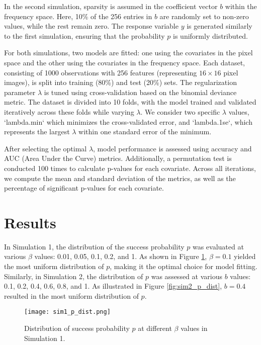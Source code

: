 \documentclass[12pt]{article}
\begin{document}
In the second simulation, sparsity is assumed in the coefficient vector \( b \) within the frequency space. Here, 10\%
of the 256 entries in \( b \) are randomly set to non-zero values, while the rest remain zero. The response variable \(
y \) is generated similarly to the first simulation, ensuring that the probability \( p \) is uniformly distributed. 

For both simulations, two models are fitted: one using the covariates in the pixel space and the other using the
covariates in the frequency space. Each dataset, consisting of 1000 observations with 256 features (representing \( 16
\times 16 \) pixel images), is split into training (80\%) and test (20\%) sets. The regularization parameter \( \lambda
\) is tuned using cross-validation based on the binomial deviance metric. The dataset is divided into 10 folds, with the
model trained and validated iteratively across these folds while varying \( \lambda \). We consider two specific \(
\lambda \) values, `lambda.min` which minimizes the cross-validated error, and `lambda.1se`, which represents the
largest \( \lambda \) within one standard error of the minimum.

After selecting the optimal \( \lambda \), model performance is assessed using accuracy and AUC (Area Under the Curve)
metrics. Additionally, a permutation test is conducted 100 times to calculate p-values for each covariate. Across all
iterations, we compute the mean and standard deviation of the metrics, as well as the percentage of significant p-values
for each covariate.  


\section*{Results}

In Simulation 1, the distribution of the success probability \( p \) was evaluated at various \( \beta \) values: 0.01,
0.05, 0.1, 0.2, and 1. As shown in Figure \ref{fig:sim1_p_dist}, \( \beta = 0.1 \) yielded the most uniform distribution
of \( p \), making it the optimal choice for model fitting. Similarly, in Simulation 2, the distribution of \( p \) was assessed at various \( b \) values: 0.1, 0.2, 0.4, 0.6, 0.8,
and 1. As illustrated in Figure \ref{fig:sim2_p_dist}, \( b = 0.4 \) resulted in the most uniform distribution of \( p
\). 

\begin{figure}[htbp] 
	\centering
	\texttt{[image: sim1\_p\_dist.png]} 
  \caption{Distribution of success probability \( p \) at different \( \beta \) values in Simulation 1.}
	\label{fig:sim1_p_dist} 
\end{figure}
\end{document}
